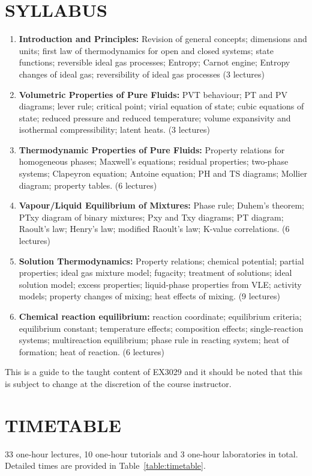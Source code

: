 \documentclass[12pts,a4paper,amsmath,amssymb,floatfix]{article}%
\begin{document}
\section{SYLLABUS}
\begin{enumerate}[{\bf 1.}]
\item {\bf Introduction and Principles:} Revision of general concepts; dimensions and units; first law of thermodynamics for open and closed systems; state functions; reversible ideal gas processes; Entropy; Carnot engine; Entropy changes of ideal gas; reversibility of ideal gas processes  (3 lectures)
\item {\bf Volumetric Properties of Pure Fluids:} PVT behaviour; PT and PV diagrams; lever rule; critical point; virial equation of state; cubic equations of state; reduced pressure and reduced temperature; volume expansivity and isothermal compressibility; latent heats.  (3 lectures)
\item {\bf Thermodynamic Properties of Pure Fluids:} Property relations for homogeneous phases; Maxwell's equations; residual properties; two-phase systems; Clapeyron equation; Antoine equation; PH and TS diagrams; Mollier diagram; property tables.  (6 lectures)
\item {\bf Vapour/Liquid Equilibrium of Mixtures:} Phase rule; Duhem’s theorem; PTxy diagram of binary mixtures; Pxy and Txy diagrams; PT diagram; Raoult's law; Henry's law; modified Raoult's law; K-value correlations.  (6 lectures)
\item {\bf Solution Thermodynamics:} Property relations; chemical potential; partial properties; ideal gas mixture model; fugacity; treatment of solutions; ideal solution model; excess properties; liquid-phase properties from VLE; activity models; property changes of mixing; heat effects of mixing.  (9 lectures)
\item {\bf Chemical reaction equilibrium:} reaction coordinate; equilibrium criteria; equilibrium constant; temperature effects; composition effects; single-reaction systems; multireaction equilibrium; phase rule in reacting system; heat of formation; heat of reaction.  (6 lectures)
\end{enumerate}

\medskip
This is a guide to the taught content of EX3029 and it should be noted that this is subject to change at the discretion of the course instructor.


\section{TIMETABLE}
33 one-hour lectures, 10 one-hour tutorials and 3 one-hour laboratories in total. Detailed times are provided in Table~\ref{table:timetable}.
\end{document}
